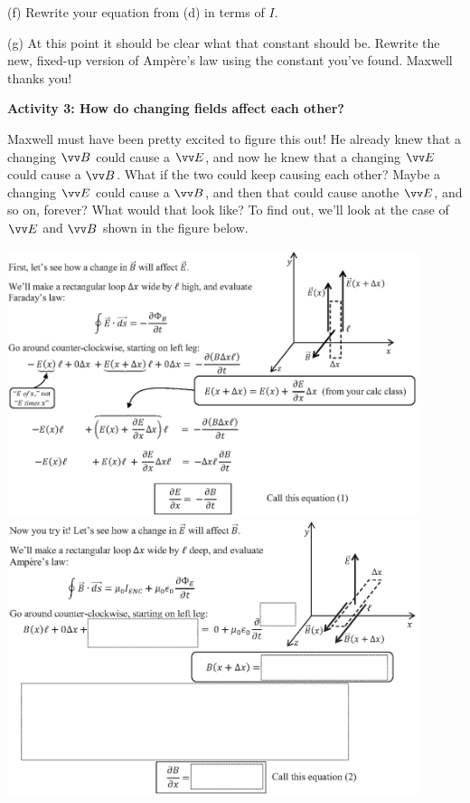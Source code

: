 (f) Rewrite your equation from (d) in terms of $I$.
\vspace{0.5in}

(g) At this point it should be clear what that constant should be.  Rewrite the new, fixed-up version of Amp\`ere's law using the constant you've found.  Maxwell thanks you!  
\vfill
\newpage

\textbf{Activity 3: How do changing fields affect each other?} 

Maxwell must have been pretty excited to figure this out!  He already knew that a changing $\vv B$ could cause a $\vv E$, and now he knew that a changing $\vv E$ could cause a $\vv B$.  What if the two could keep causing each other?  Maybe a changing $\vv E$ could cause a $\vv B$, and then that could cause anothe $\vv E$, and so on, forever?  What would that look like? To find out, we'll look at the case of $\vv E$ and $\vv B$ shown in the figure below.


\vspace{-0.1in}
\includegraphics[width=0.9\textwidth]{deriving_em_waves/change_in_B.eps} \newline
\underline{\hspace{\textwidth}}
\includegraphics[width=0.9\textwidth]{deriving_em_waves/change_in_E_bw.eps}
\newpage

